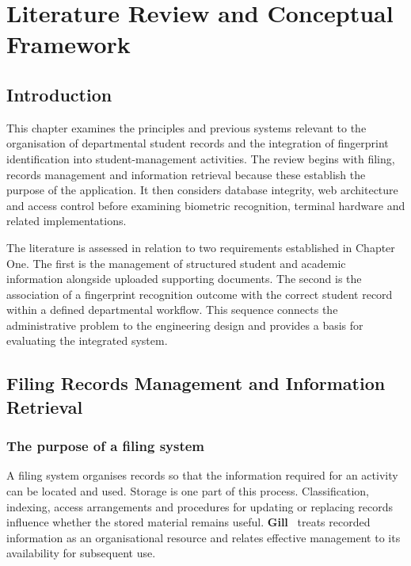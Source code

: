 \chapter{Literature Review and Conceptual Framework}\label{chap:2}

\section{Introduction}\label{sec:2-1}

This chapter examines the principles and previous systems relevant to the organisation of departmental student records and the integration of fingerprint identification into student-management activities. The review begins with filing, records management and information retrieval because these establish the purpose of the application. It then considers database integrity, web architecture and access control before examining biometric recognition, terminal hardware and related implementations.

The literature is assessed in relation to two requirements established in Chapter One. The first is the management of structured student and academic information alongside uploaded supporting documents. The second is the association of a fingerprint recognition outcome with the correct student record within a defined departmental workflow. This sequence connects the administrative problem to the engineering design and provides a basis for evaluating the integrated system.

\section{Filing Records Management and Information Retrieval}\label{sec:2-2}

\subsection{The purpose of a filing system}\label{sec:2-2-1}

A filing system organises records so that the information required for an activity can be located and used. Storage is one part of this process. Classification, indexing, access arrangements and procedures for updating or replacing records influence whether the stored material remains useful. \textbf{Gill}~\cite[pp. 3-6]{gill1993} treats recorded information as an organisational resource and relates effective management to its availability for subsequent use.

